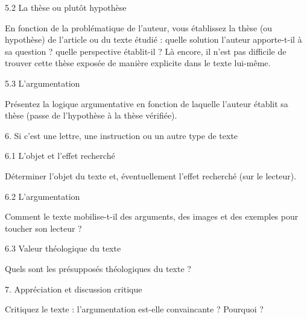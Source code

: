 5.2	 La thèse ou plutôt hypothèse

En fonction de la problématique de l’auteur, vous établissez la thèse (ou hypothèse) de l’article ou du texte étudié : quelle solution l’auteur apporte-t-il à sa question ? quelle perspective établit-il ? Là encore, il n’est pas difficile de trouver cette thèse exposée de manière explicite dans le texte lui-même. 

5.3	 L’argumentation 


Présentez la logique argumentative en fonction de laquelle l’auteur établit sa thèse (passe de l’hypothèse à la thèse vérifiée).

6.	Si c’est une lettre, une instruction ou un autre type de texte

	6.1 L’objet et l’effet recherché

Déterminer l’objet du texte et, éventuellement l’effet recherché (sur le lecteur).

6.2	 L’argumentation

Comment le texte mobilise-t-il des arguments, des images et des exemples pour toucher son lecteur ?

6.3	 Valeur théologique du texte

Quels sont les présupposés théologiques du texte ?


7.  Appréciation et discussion critique 

Critiquez le texte : l’argumentation est-elle convaincante ? Pourquoi ?
